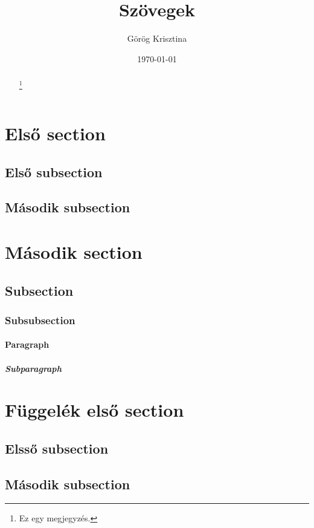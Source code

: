 \documentclass[twoside]{article}
\title{Szövegek}
\author{Görög Krisztina}
\date{\today}
\begin{document}
\renewcommand{\thefootnote}{\fnsymbol{footnote}}
\maketitle

\begin{abstract}
\hulipsum[1]\footnote{Ez egy megjegyzés.}
\end{abstract}

\setcounter{tocdepth}{5}
\tableofcontents
\clearpage

\setcounter{secnumdepth}{5}

\section{Első section}
\subsection{Első subsection}
\hulipsum

\subsection{Második subsection}
\hulipsum

\section[Második]{Második section}
\subsection{Subsection}
\subsubsection{Subsubsection}
\paragraph{Paragraph}
\subparagraph{Subparagraph}

\appendix
\section{Függelék első section}
\subsection{Elsső subsection}
\quote{\hulipsum[2]}
\subsection{Második subsection}
\quotation{\hulipsum[2]}
\end{document}
